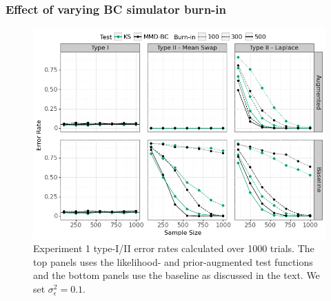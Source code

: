 \documentclass{article}
\begin{document}
\subsubsection{Effect of varying BC simulator burn-in}
\begin{figure}[H]
    \centering
    \includegraphics[width=\textwidth]{figures/results_1b.png}
    \caption{Experiment 1 type-I/II error rates calculated over 1000 trials. The top panels uses the likelihood- and prior-augmented test functions and the bottom panels use the baseline as discussed in the text. We set $\sigma_{\epsilon}^{2}=0.1$.}
    \label{fig:ex1_auto}
\end{figure}
\end{document}
